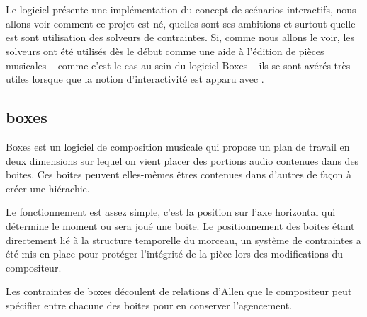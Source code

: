 \subsubsection{\ortools{}}
















\section{\iscore{}}

Le logiciel \iscore{} présente une implémentation du concept de scénarios interactifs, nous allons voir comment ce projet est né, quelles sont ses ambitions et surtout quelle est sont utilisation des solveurs de contraintes. Si, comme nous allons le voir, les solveurs ont été utilisés dès le début comme une aide à l'édition de pièces musicales -- comme c'est le cas au sein du logiciel Boxes -- ils se sont avérés très utiles lorsque que la notion d'interactivité est apparu avec \iscore{}.

\subsection{boxes}%

Boxes\cite{Beurive2000boxes} est un logiciel de composition musicale qui propose un plan de travail en deux dimensions  sur lequel on vient placer des portions audio contenues dans des boites. Ces boites peuvent elles-mêmes êtres contenues dans d'autres de façon à créer une hiérachie.


Le fonctionnement est assez simple, c'est la position sur l'axe horizontal qui détermine le moment ou sera joué une boite. Le positionnement des boites étant directement lié à la structure temporelle du morceau, un système de contraintes a été mis en place pour protéger l'intégrité de la pièce lors des modifications du compositeur.

Les contraintes de boxes découlent de relations d'Allen  que le compositeur peut spécifier entre chacune des boites pour en conserver l'agencement.



